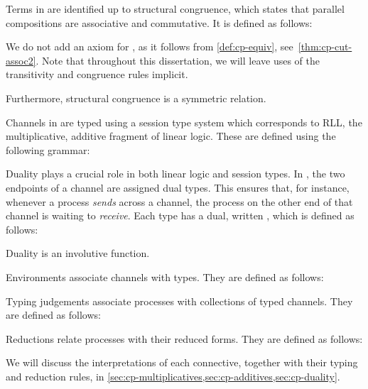 Terms in \rcp are identified up to structural congruence, which states that
parallel compositions  are associative and commutative.
It is defined as follows:

We do not add an axiom for , as it follows from
\cref{def:cp-equiv}, see~\cref{thm:cp-cut-assoc2}.
Note that throughout this dissertation, we will leave uses of the transitivity
and congruence rules implicit.

Furthermore, structural congruence is a symmetric relation.

%
Channels in \rcp are typed using a session type system which corresponds to RLL,
the multiplicative, additive fragment of linear logic.
These are defined using the following grammar:

Duality plays a crucial role in both linear logic and session types.
In \rcp, the two endpoints of a channel are assigned dual types.
This ensures that, for instance, whenever a process \emph{sends} across a
channel, the process on the other end of that channel is waiting to
\emph{receive}.
Each type  has a dual, written , which is defined as follows:

Duality is an involutive function.

%
Environments associate channels with types. They are defined as follows:

Typing judgements associate processes with collections of typed channels. They
are defined as follows:


Reductions relate processes with their reduced forms.
They are defined as follows:



We will discuss the interpretations of each connective, together with their
typing and reduction rules, in \cref{sec:cp-multiplicatives,sec:cp-additives,sec:cp-duality}.

